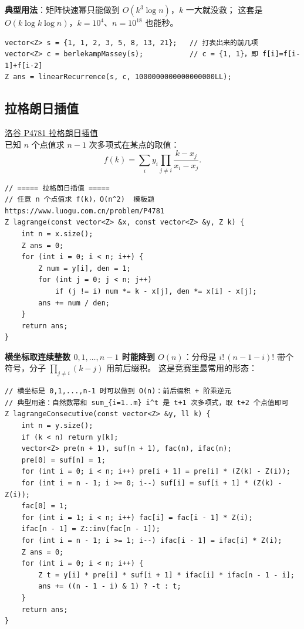 		\textbf{典型用法}：矩阵快速幂只能做到 $O(k^3\log n)$，$k$ 一大就没救；
		这套是 $O(k\log k\log n)$，$k = 10^4$、$n = 10^{18}$ 也能秒。

		\begin{verbatim}
vector<Z> s = {1, 1, 2, 3, 5, 8, 13, 21};   // 打表出来的前几项
vector<Z> c = berlekampMassey(s);           // c = {1, 1}，即 f[i]=f[i-1]+f[i-2]
Z ans = linearRecurrence(s, c, 1000000000000000000LL);
		\end{verbatim}

		\subsection{拉格朗日插值}

		\href{https://www.luogu.com.cn/problem/P4781}{洛谷 P4781 拉格朗日插值} \\

		已知 $n$ 个点值求 $n-1$ 次多项式在某点的取值：
		$$f(k) = \sum_{i} y_i \prod_{j \neq i} \frac{k - x_j}{x_i - x_j}.$$

		\begin{verbatim}
// ===== 拉格朗日插值 =====
// 任意 n 个点值求 f(k)，O(n^2)  模板题 https://www.luogu.com.cn/problem/P4781
Z lagrange(const vector<Z> &x, const vector<Z> &y, Z k) {
    int n = x.size();
    Z ans = 0;
    for (int i = 0; i < n; i++) {
        Z num = y[i], den = 1;
        for (int j = 0; j < n; j++)
            if (j != i) num *= k - x[j], den *= x[i] - x[j];
        ans += num / den;
    }
    return ans;
}
		\end{verbatim}

		\textbf{横坐标取连续整数 $0,1,\dots,n-1$ 时能降到 $O(n)$}：分母是
		$i!\,(n-1-i)!$ 带个符号，分子 $\prod_{j\neq i}(k-j)$ 用前后缀积。
		这是竞赛里最常用的形态：

		\begin{verbatim}
// 横坐标是 0,1,...,n-1 时可以做到 O(n)：前后缀积 + 阶乘逆元
// 典型用途：自然数幂和 sum_{i=1..m} i^t 是 t+1 次多项式，取 t+2 个点值即可
Z lagrangeConsecutive(const vector<Z> &y, ll k) {
    int n = y.size();
    if (k < n) return y[k];
    vector<Z> pre(n + 1), suf(n + 1), fac(n), ifac(n);
    pre[0] = suf[n] = 1;
    for (int i = 0; i < n; i++) pre[i + 1] = pre[i] * (Z(k) - Z(i));
    for (int i = n - 1; i >= 0; i--) suf[i] = suf[i + 1] * (Z(k) - Z(i));
    fac[0] = 1;
    for (int i = 1; i < n; i++) fac[i] = fac[i - 1] * Z(i);
    ifac[n - 1] = Z::inv(fac[n - 1]);
    for (int i = n - 1; i >= 1; i--) ifac[i - 1] = ifac[i] * Z(i);
    Z ans = 0;
    for (int i = 0; i < n; i++) {
        Z t = y[i] * pre[i] * suf[i + 1] * ifac[i] * ifac[n - 1 - i];
        ans += ((n - 1 - i) & 1) ? -t : t;
    }
    return ans;
}
		\end{verbatim}

